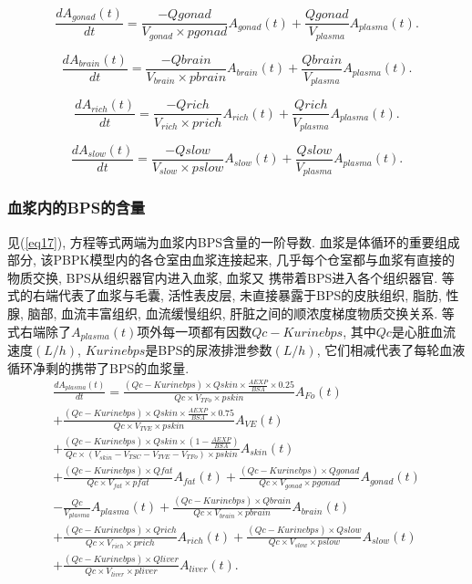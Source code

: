 \documentclass[a4paper,punct=banjiao,twoside]{ctexrep}
\theoremstyle{plain}
\theoremstyle{definition}
\theoremstyle{remark}
\begin{document}
\begin{equation}\label{eq16}
  \frac{dA_{gonad}(t)}{dt}=\frac{-Qgonad}{V_{gonad}  \times  pgonad} A_{gonad}(t)+\frac{Qgonad}{V_{plasma}}  A_{plasma}(t).
\end{equation}

\begin{equation}\label{eq18}
  \frac{dA_{brain}(t)}{dt}=\frac{-Qbrain}{V_{brain}  \times  pbrain} A_{brain}(t)+\frac{Qbrain}{V_{plasma}}  A_{plasma}(t).
\end{equation}

\begin{equation}\label{eq19}
  \frac{dA_{rich}(t)}{dt}=\frac{-Qrich}{V_{rich}  \times  prich} A_{rich}(t)+\frac{Qrich}{V_{plasma}}  A_{plasma}(t).
\end{equation}

\begin{equation}\label{eq20}
  \frac{dA_{slow}(t)}{dt}=\frac{-Qslow}{V_{slow}  \times  pslow} A_{slow}(t)+\frac{Qslow}{V_{plasma}}  A_{plasma}(t).
\end{equation}

\subsubsection*{血浆内的BPS的含量}
见(\ref{eq17}), 方程等式两端为血浆内BPS含量的一阶导数. 血浆是体循环的重要组成部分, 该PBPK模型内的各仓室由血浆连接起来, 几乎每个仓室都与血浆有直接的物质交换, BPS从组织器官内进入血浆, 血浆又
携带着BPS进入各个组织器官. 等式的右端代表了血浆与毛囊, 活性表皮层, 未直接暴露于BPS的皮肤组织, 脂肪, 性腺, 脑部, 血流丰富组织, 血流缓慢组织, 肝脏之间的顺浓度梯度物质交换关系. 
等式右端除了$A_{plasma}(t)$项外每一项都有因数$Qc-Kurinebps$, 其中$Qc$是心脏血流速度$(L/h)$, $Kurinebps$是BPS的尿液排泄参数$(L/h)$, 它们相减代表了每轮血液循环净剩的携带了BPS的血浆量.
\begin{multline}\label{eq17}
  \frac{dA_{plasma}(t)}{dt}=\frac{(Qc-Kurinebps) \times  Qskin \times  \frac{AEXP}{BSA} \times  0.25}{Qc \times  V_{TFo}  \times  pskin} A_{Fo}(t)\\
  +\frac{(Qc-Kurinebps) \times  Qskin \times  \frac{AEXP}{BSA} \times  0.75}{Qc \times  V_{TVE}  \times  pskin} A_{VE}(t)\\
  +\frac{(Qc-Kurinebps) \times  Qskin \times  (1-\frac{AEXP}{BSA})}{Qc \times  (V_{skin}-V_{TSC}-V_{TVE}-V_{TFo}) \times  pskin} A_{skin}(t)\\
  +\frac{(Qc-Kurinebps) \times  Qfat}{Qc \times  V_{fat}  \times  pfat} A_{fat}(t)
  +\frac{(Qc-Kurinebps) \times  Qgonad}{Qc \times  V_{gonad}  \times  pgonad} A_{gonad}(t)\\
  -\frac{Qc}{V_{plasma}}  A_{plasma}(t)+\frac{(Qc-Kurinebps) \times  Qbrain}{Qc \times  V_{brain} \times  pbrain} A_{brain}(t)\\
  +\frac{(Qc-Kurinebps) \times  Qrich}{Qc \times  V_{rich}  \times  prich} A_{rich}(t)
  +\frac{(Qc-Kurinebps) \times  Qslow}{Qc \times  V_{slow}  \times  pslow} A_{slow}(t)\\
  +\frac{(Qc-Kurinebps) \times  Qliver}{Qc \times  V_{liver} \times  pliver} A_{liver}(t).
\end{multline}
\end{document}
